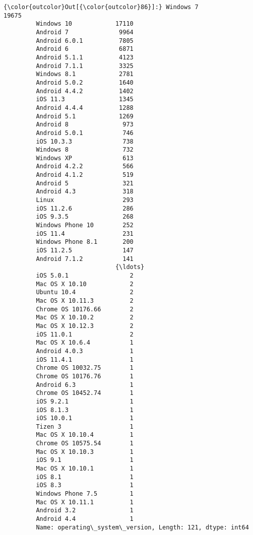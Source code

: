 \documentclass[11pt]{article}
\begin{document}
\begin{Verbatim}[commandchars=\\\{\}]
{\color{outcolor}Out[{\color{outcolor}86}]:} Windows 7             19675
         Windows 10            17110
         Android 7              9964
         Android 6.0.1          7805
         Android 6              6871
         Android 5.1.1          4123
         Android 7.1.1          3325
         Windows 8.1            2781
         Android 5.0.2          1640
         Android 4.4.2          1402
         iOS 11.3               1345
         Android 4.4.4          1288
         Android 5.1            1269
         Android 8               973
         Android 5.0.1           746
         iOS 10.3.3              738
         Windows 8               732
         Windows XP              613
         Android 4.2.2           566
         Android 4.1.2           519
         Android 5               321
         Android 4.3             318
         Linux                   293
         iOS 11.2.6              286
         iOS 9.3.5               268
         Windows Phone 10        252
         iOS 11.4                231
         Windows Phone 8.1       200
         iOS 11.2.5              147
         Android 7.1.2           141
                               {\ldots}  
         iOS 5.0.1                 2
         Mac OS X 10.10            2
         Ubuntu 10.4               2
         Mac OS X 10.11.3          2
         Chrome OS 10176.66        2
         Mac OS X 10.10.2          2
         Mac OS X 10.12.3          2
         iOS 11.0.1                2
         Mac OS X 10.6.4           1
         Android 4.0.3             1
         iOS 11.4.1                1
         Chrome OS 10032.75        1
         Chrome OS 10176.76        1
         Android 6.3               1
         Chrome OS 10452.74        1
         iOS 9.2.1                 1
         iOS 8.1.3                 1
         iOS 10.0.1                1
         Tizen 3                   1
         Mac OS X 10.10.4          1
         Chrome OS 10575.54        1
         Mac OS X 10.10.3          1
         iOS 9.1                   1
         Mac OS X 10.10.1          1
         iOS 8.1                   1
         iOS 8.3                   1
         Windows Phone 7.5         1
         Mac OS X 10.11.1          1
         Android 3.2               1
         Android 4.4               1
         Name: operating\_system\_version, Length: 121, dtype: int64
\end{Verbatim}
            
\end{document}
